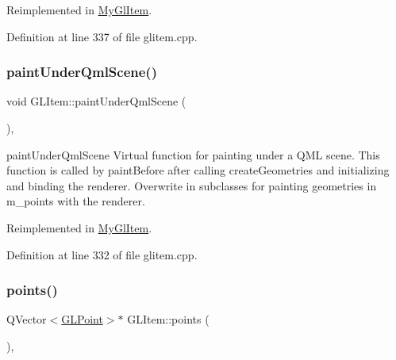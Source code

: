 Reimplemented in \mbox{\hyperlink{class_my_gl_item_ad9f060b5a805367e0fbf065e9318c0b1}{My\+Gl\+Item}}.



Definition at line 337 of file glitem.\+cpp.

\mbox{\label{class_g_l_item_a6e779fa84599e999b6e299d5aac92fa2}} 
\subsubsection{\texorpdfstring{paintUnderQmlScene()}{paintUnderQmlScene()}}
{\footnotesize\ttfamily void G\+L\+Item\+::paint\+Under\+Qml\+Scene (\begin{DoxyParamCaption}{ }\end{DoxyParamCaption})\hspace{0.3cm}{\ttfamily [protected]}, {\ttfamily [virtual]}}



paint\+Under\+Qml\+Scene Virtual function for painting under a Q\+ML scene. This function is called by paint\+Before after calling create\+Geometries and initializing and binding the renderer. Overwrite in subclasses for painting geometries in m\+\_\+points with the renderer. 



Reimplemented in \mbox{\hyperlink{class_my_gl_item_a46ffc33e9892262f9d1d88c14fa0e092}{My\+Gl\+Item}}.



Definition at line 332 of file glitem.\+cpp.

\mbox{\label{class_g_l_item_a30a7ce7ab52ac63010cc3f692406b259}} 
\subsubsection{\texorpdfstring{points()}{points()}}
{\footnotesize\ttfamily Q\+Vector$<$\mbox{\hyperlink{class_g_l_point}{G\+L\+Point}}$>$$\ast$ G\+L\+Item\+::points (\begin{DoxyParamCaption}{ }\end{DoxyParamCaption})\hspace{0.3cm}{\ttfamily [inline]}, {\ttfamily [protected]}}



